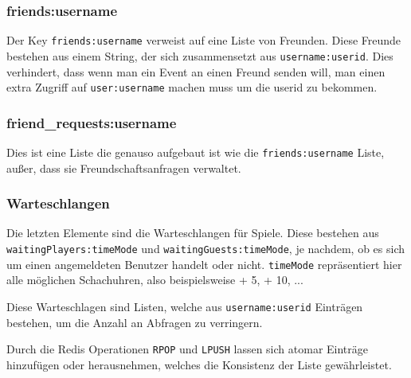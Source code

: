 \subsubsection{friends:username}
Der Key \verb|friends:username| verweist auf eine Liste von Freunden. Diese Freunde bestehen aus einem String, der sich zusammensetzt aus \verb|username:userid|. Dies verhindert, dass wenn man ein Event an einen Freund senden will, man einen extra Zugriff auf \verb|user:username| machen muss um die userid zu bekommen.

\subsubsection{friend\_requests:username}
Dies ist eine Liste die genauso aufgebaut ist wie die \verb|friends:username| Liste, außer, dass sie Freundschaftsanfragen verwaltet.

\subsubsection{Warteschlangen}
\label{sec:Warteschlange}
Die letzten Elemente sind die Warteschlangen für Spiele. Diese bestehen aus \verb|waitingPlayers:timeMode| und \verb|waitingGuests:timeMode|, je nachdem, ob es sich um einen angemeldeten Benutzer handelt oder nicht. \verb|timeMode| repräsentiert hier alle möglichen Schachuhren, also beispielsweise  + 5\grqq ,  + 10\grqq , ...

Diese Warteschlagen sind Listen, welche aus \verb|username:userid| Einträgen bestehen, um die Anzahl an Abfragen zu verringern. 

Durch die Redis Operationen \verb|RPOP| und \verb|LPUSH| lassen sich atomar Einträge hinzufügen oder herausnehmen, welches die Konsistenz der Liste gewährleistet.